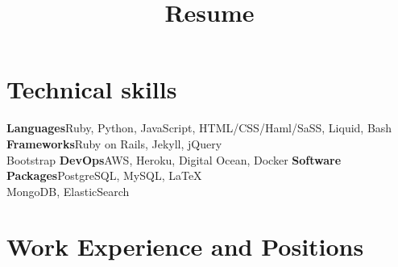 \documentclass[11pt,a4paper]{moderncv}
\title{Resume}
\begin{document}
\maketitle

\section{Technical skills}
\cvcomputer
{\textbf{Languages}}{Ruby, Python, JavaScript, HTML/CSS/Haml/SaSS, Liquid, Bash}
{\textbf{Frameworks}}{Ruby on Rails, Jekyll, jQuery\\Bootstrap}
\cvcomputer
{\textbf{DevOps}}{AWS, Heroku, Digital Ocean, Docker}
{\textbf{Software Packages}}{PostgreSQL, MySQL, \LaTeX\\MongoDB, ElasticSearch}


\section{Work Experience and Positions}
\end{document}
